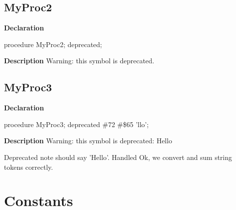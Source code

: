 \documentclass{report}
\begin{document}
\subsection*{MyProc2}
\begin{list}{}{
\setlength{\itemindent}{0cm}
\setlength{\listparindent}{0cm}
\setlength{\leftmargin}{\evensidemargin}
\addtolength{\leftmargin}{\tmplength}
\settowidth{\labelsep}{X}
\addtolength{\leftmargin}{\labelsep}
\setlength{\labelwidth}{\tmplength}
}
\begin{flushleft}
\item[\textbf{Declaration}\hfill]
\begin{ttfamily}
procedure MyProc2; deprecated;\end{ttfamily}


\end{flushleft}
\par
\item[\textbf{Description}]
Warning: this symbol is deprecated.

 

\end{list}
\subsection*{MyProc3}
\begin{list}{}{
\setlength{\itemindent}{0cm}
\setlength{\listparindent}{0cm}
\setlength{\leftmargin}{\evensidemargin}
\addtolength{\leftmargin}{\tmplength}
\settowidth{\labelsep}{X}
\addtolength{\leftmargin}{\labelsep}
\setlength{\labelwidth}{\tmplength}
}
\begin{flushleft}
\item[\textbf{Declaration}\hfill]
\begin{ttfamily}
procedure MyProc3; deprecated {\#}72 {\#}{\$}65 'llo';\end{ttfamily}


\end{flushleft}
\par
\item[\textbf{Description}]
Warning: this symbol is deprecated: Hello

Deprecated note should say 'Hello'. Handled Ok, we convert and sum string tokens correctly.

\end{list}
\section{Constants}
\end{document}
